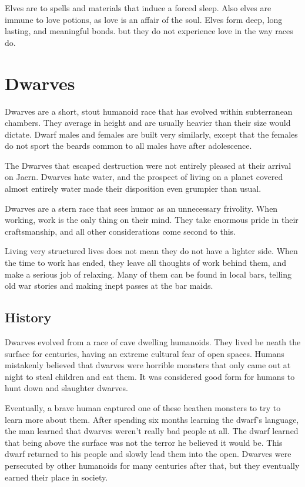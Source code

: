 \begin{multicols*}{2}
Elves are  to spells and materials that induce a forced sleep. Also elves are immune to love potions, as love is an affair of the soul. Elves form deep, long lasting, and meaningful bonds. but they do not experience love in the way races do.
\makeline
\section{Dwarves}
Dwarves are a short, stout humanoid race that has evolved within subterranean chambers. They average  in height and are usually heavier than their size would dictate. Dwarf males and females are built very similarly, except that the females do not sport the beards common to all males have after adolescence.

The Dwarves that escaped  destruction were not entirely pleased at their arrival on Jaern. Dwarves hate water, and the prospect of living on a planet covered almost entirely water made their disposition even grumpier than usual.

Dwarves are a stern race that sees humor as an unnecessary frivolity. When working, work is the only thing on their mind. They take enormous pride in their craftsmanship, and all other considerations come second to this.

Living very structured lives does not mean they do not have a lighter side. When the time to work has ended, they leave all thoughts of work behind them, and make a serious job of relaxing. Many of them can be found in local bars, telling old war stories and making inept passes at the bar maids.
\subsection{History}
Dwarves evolved from a race of cave dwelling humanoids. They lived be neath the surface for centuries, having an extreme cultural fear of open spaces. Humans mistakenly believed that dwarves were horrible monsters that only came out at night to steal children and eat them. It was considered good form for humans to hunt down and slaughter dwarves.

Eventually, a brave human captured one of these heathen monsters to try to learn more about them. After spending six months learning the dwarf's language, the man learned that dwarves weren't really bad people at all. The dwarf learned that being above the surface was not the terror he believed it would be. This dwarf returned to his people and slowly lead them into the open. Dwarves were persecuted by other humanoids for many centuries after that, but they eventually earned their place in society.

\end{multicols*}
